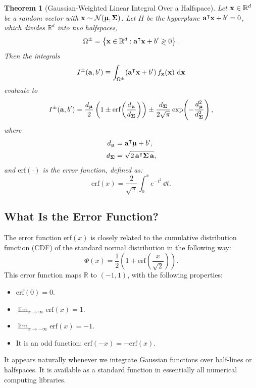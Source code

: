 \documentclass[11pt, letterpaper]{article}
\newcommand{\bSigma}{\vb{\Sigma}}
\newcommand{\bmu}{\boldsymbol{\upmu}}
\newcommand{\R}{\mathbb{R}}
\newcommand{\Norm}{\mathcal{N}}
\newtheorem{theorem}{Theorem}[section]
\begin{document}
\begin{theorem}[Gaussian-Weighted Linear Integral Over a Halfspace]\label{thm:halfspace}
Let $\vb{x} \in \R^d$ be a random vector with $\vb{x} \sim \Norm(\bmu, \bSigma)$. Let $H$ be the hyperplane $\vb{a}^{\intercal} \vb{x} + b' = 0$, which divides $\R^d$ into two halfspaces,
\begin{equation}
    \Omega^{\pm} = \left\{\vb{x} \in \R^d : \vb{a}^{\intercal} \vb{x} + b' \gtrless 0\right\}.
\end{equation}
Then the integrals
\begin{equation}\label{eq:halfspace_integral_def}
    I^{\pm}(\vb{a}, b') \equiv \int_{\Omega^{\pm}} (\vb{a}^{\intercal} \vb{x} + b')\, f_{\vb{x}}(\vb{x})\, \dd{\vb{x}}
\end{equation}
evaluate to
\begin{equation}\label{eq:halfspace_integral}
    I^{\pm}(\vb{a}, b') = \frac{d_{\bmu}}{2}\left(1 \pm \mathrm{erf}\!\left(\frac{d_{\bmu}}{d_{\bSigma}}\right)\right) \pm \frac{d_{\bSigma}}{2\sqrt{\pi}} \exp\!\left(-\frac{d_{\bmu}^2}{d_{\bSigma}^2}\right),
\end{equation}
where
\begin{align}
    d_{\bmu} &= \vb{a}^{\intercal} \bmu + b', \label{eq:d_mu}\\
    d_{\bSigma} &= \sqrt{2\, \vb{a}^{\intercal} \bSigma\, \vb{a}}, \label{eq:d_sigma}
\end{align}
and $\mathrm{erf}(\cdot)$ is the \emph{error function}, defined as:
\begin{equation}\label{eq:erf_def}
    \mathrm{erf}(x) = \frac{2}{\sqrt{\pi}} \int_0^x e^{-t^2}\, \dd{t}.
\end{equation}
\end{theorem}

\subsection{What Is the Error Function?}

The error function $\mathrm{erf}(x)$ is closely related to the cumulative distribution function (CDF) of the standard normal distribution in the following way:
\begin{equation*}
    \Phi(x) = \frac{1}{2}\left(1 + \mathrm{erf}\left(\frac{x}{\sqrt{2}}\right)\right).
\end{equation*}
This error function maps $\R$ to $(-1, 1)$, with the following properties:
\begin{itemize}[leftmargin=2em]
    \item $\mathrm{erf}(0) = 0$.
    \item $\lim_{x\to \infty}\mathrm{erf}(x) = 1$.
    \item $\lim_{x\to -\infty}\mathrm{erf}(x) = -1$.
    \item It is an odd function: $\mathrm{erf}(-x) = -\mathrm{erf}(x)$.
\end{itemize}
It appears naturally whenever we integrate Gaussian functions over half-lines or halfspaces. It is available as a standard function in essentially all numerical computing libraries.
\end{document}
